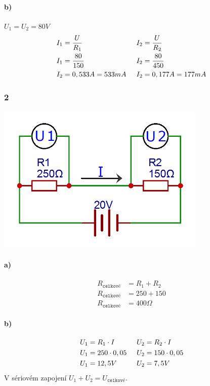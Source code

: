 \documentclass[12pt]{article}
\begin{document}
\paragraph{b)}
$U_1 = U_2 = 80V$
\begin{equation}
\begin{split}
\nonumber
I_1&=\frac{U}{R_1}\\
I_1&=\frac{80}{150}\\
I_2&=0,533A = 533mA
\end{split}
\hspace{0,5cm}
\begin{split}
\nonumber
I_2&=\frac{U}{R_2}\\
I_2&=\frac{80}{450}\\
I_2&=0,177A = 177mA
\end{split}
\end{equation}
\subsubsection*{2}
\includegraphics[width=10cm]{Ohm_002.png}
\paragraph{a)}
\begin{equation}
\begin{split}
\nonumber
R_{\texttt{celkové}}&=R_1+R_2\\
R_{\texttt{celkové}}&=250+150\\
R_{\texttt{celkové}}&=400\Omega
\end{split}
\end{equation}
\paragraph{b)}

\begin{equation}
\begin{split}
\nonumber
U_1&=R_1\cdot I\\
U_1&=250\cdot 0,05\\
U_1&=12,5V
\end{split}
\hspace{0,5cm}
\begin{split}
\nonumber
U_2&=R_2\cdot I\\
U_2&=150\cdot 0,05\\
U_2&=7,5V
\end{split}
\end{equation}
V sériovém zapojení $U_1+U_2 = U_{\texttt{celkové}}$.
\end{document}
